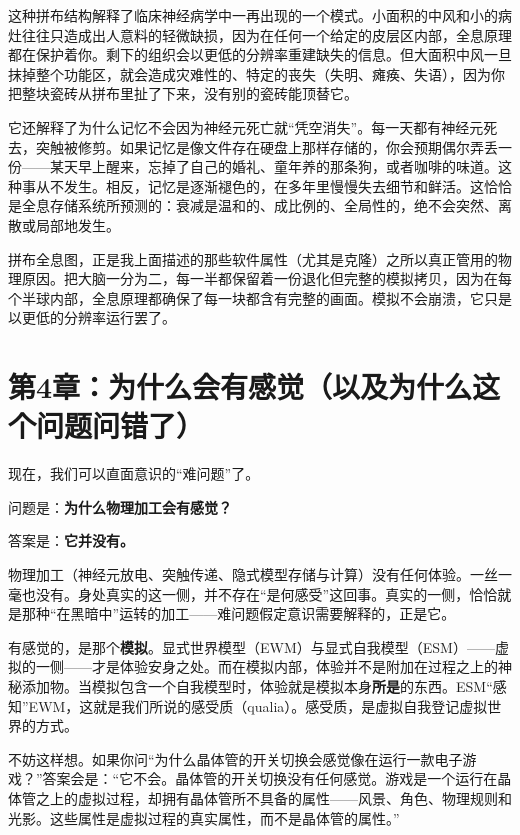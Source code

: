 \documentclass[11pt, twoside, openright]{book}
\begin{document}
这种拼布结构解释了临床神经病学中一再出现的一个模式。小面积的中风和小的病灶往往只造成出人意料的轻微缺损，因为在任何一个给定的皮层区内部，全息原理都在保护着你。剩下的组织会以更低的分辨率重建缺失的信息。但大面积中风一旦抹掉整个功能区，就会造成灾难性的、特定的丧失（失明、瘫痪、失语），因为你把整块瓷砖从拼布里扯了下来，没有别的瓷砖能顶替它。

它还解释了为什么记忆不会因为神经元死亡就“凭空消失”。每一天都有神经元死去，突触被修剪。如果记忆是像文件存在硬盘上那样存储的，你会预期偶尔弄丢一份------某天早上醒来，忘掉了自己的婚礼、童年养的那条狗，或者咖啡的味道。这种事从不发生。相反，记忆是逐渐褪色的，在多年里慢慢失去细节和鲜活。这恰恰是全息存储系统所预测的：衰减是温和的、成比例的、全局性的，绝不会突然、离散或局部地发生。

拼布全息图，正是我上面描述的那些软件属性（尤其是克隆）之所以真正管用的物理原因。把大脑一分为二，每一半都保留着一份退化但完整的模拟拷贝，因为在每个半球内部，全息原理都确保了每一块都含有完整的画面。模拟不会崩溃，它只是以更低的分辨率运行罢了。


\chapter*{第4章：为什么会有感觉（以及为什么这个问题问错了）}

现在，我们可以直面意识的“难问题”了。

问题是：\textbf{为什么物理加工会有感觉？}

答案是：\textbf{它并没有。}

物理加工（神经元放电、突触传递、隐式模型存储与计算）没有任何体验。一丝一毫也没有。身处真实的这一侧，并不存在“是何感受”这回事。真实的一侧，恰恰就是那种“在黑暗中”运转的加工------难问题假定意识需要解释的，正是它。

有感觉的，是那个\textbf{模拟}。显式世界模型（EWM）与显式自我模型（ESM）------虚拟的一侧------才是体验安身之处。而在模拟内部，体验并不是附加在过程之上的神秘添加物。当模拟包含一个自我模型时，体验就是模拟本身\textbf{所是}的东西。ESM“感知”EWM，这就是我们所说的感受质（qualia）。感受质，是虚拟自我登记虚拟世界的方式。

不妨这样想。如果你问“为什么晶体管的开关切换会感觉像在运行一款电子游戏？”答案会是：“它不会。晶体管的开关切换没有任何感觉。游戏是一个运行在晶体管之上的虚拟过程，却拥有晶体管所不具备的属性------风景、角色、物理规则和光影。这些属性是虚拟过程的真实属性，而不是晶体管的属性。”
\end{document}
